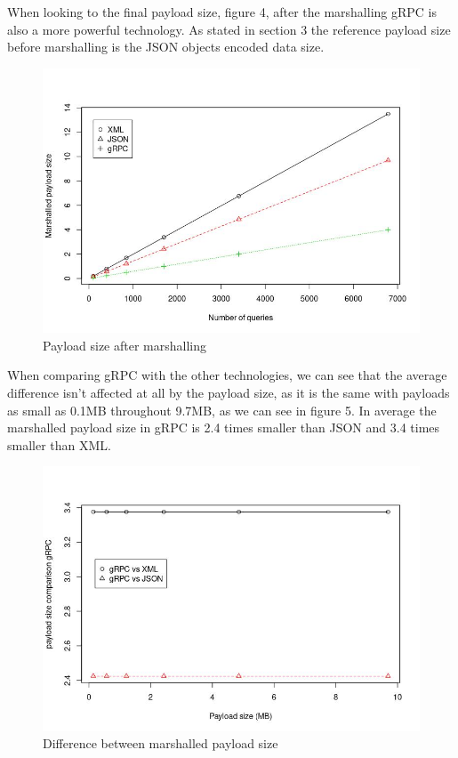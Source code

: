 \documentclass{article}
\begin{document}
\qquad When looking to the final payload size, figure 4, after the marshalling \ac{gRPC} is also a more powerful technology. As stated in section 3 the reference payload size before marshalling is the \ac{JSON} objects encoded data size.

\begin{figure}[H]
 \centering
 \includegraphics[scale=0.33]{payload_total_size.jpeg}
 \caption{Payload size after marshalling}
\end{figure}

\qquad When comparing gRPC with the other technologies, we can see that the average difference isn't affected at all by the payload size, as it is the same with payloads as small as 0.1MB throughout 9.7MB, as we can see in figure 5. In average the marshalled payload size in \ac{gRPC} is 2.4 times smaller than \ac{JSON} and 3.4 times smaller than \ac{XML}.

\begin{figure}[H]
 \centering
 \includegraphics[scale=0.34]{payload_comp_size.jpeg}
 \caption{Difference between marshalled payload size}
\end{figure}
\end{document}

